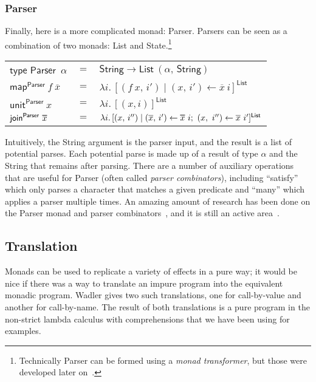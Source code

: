 \documentclass[acmsmall, nonacm, screen]{acmart}
\newcommand\doverline[1]{%
  \setbox0=\hbox{$\overline{#1}$}%
  \ht0=\dimexpr\ht0-.30ex\relax%
  \overline{\copy0}%
}
\newcommand{\lambdaE}[2]{\lambda #1.\, #2}
\newcommand{\map}[3]{\textsf{map}^{\textsf{#1}}~#2~#3}
\newcommand{\unit}[2]{\textsf{unit}^{\textsf{#1}}~#2}
\newcommand{\join}[2]{\textsf{join}^{\textsf{#1}}~#2}
\begin{document}
\subsubsection{Parser}
Finally, here is a more complicated monad: \textsf{Parser}. Parsers can be seen as a combination
of two monads: \textsf{List} and \textsf{State}.\footnote{Technically \textsf{Parser} can be
formed using a {\em monad transformer}, but those were developed later on~\cite{liang1995monad}.}
\begin{center}
  \begin{tabular}{lll}
    $\textsf{type Parser}$~$\alpha$ & $=$ & $\textsf{String} \to \textsf{List}~(\alpha,\, \textsf{String})$ \\
    $\map{Parser}{f}{\overline{x}}$ & $=$ & $\lambdaE{i}{[(f~x,\, i') \mid (x,\, i') \leftarrow \overline{x}~i]^{\textsf{List}}}$ \\
    $\unit{Parser}{x}$ & $=$ & $\lambdaE{i}{[(x, i)]^{\textsf{List}}}$ \\
    $\join{Parser}{\doverline{x}}$ & $=$ & $\lambdaE{i}{[(x,\, i'') \mid (\overline{x},\, i') \leftarrow \doverline{x}~i;\ (x,\ i'') \leftarrow \overline{x}~i']^{\textsf{List}}}$
  \end{tabular}
\end{center}
Intuitively, the \textsf{String} argument is the parser input, and the result is a list of
potential parses. Each potential parse is made up of a result of type $\alpha$ and the
\textsf{String} that remains after parsing. There are a number of auxiliary operations that are
useful for \textsf{Parser} (often called {\em parser combinators}), including ``\textsf{satisfy}''
which only parses a character that matches a given predicate and ``\textsf{many}'' which applies a
parser multiple times. An amazing amount of research has been done on the \textsf{Parser} monad
and parser combinators~\cite{hutton1996monadic, leijen2001parsec}, and it is still an active
area~\cite{willis2020staged}.

\subsection{Translation}

Monads can be used to replicate a variety of effects in a pure way; it would be nice if there was
a way to translate an impure program into the equivalent monadic program. Wadler gives two such
translations, one for call-by-value and another for call-by-name. The result of both translations
is a pure program in the non-strict lambda calculus with comprehensions that we have been using for
examples.
\end{document}
